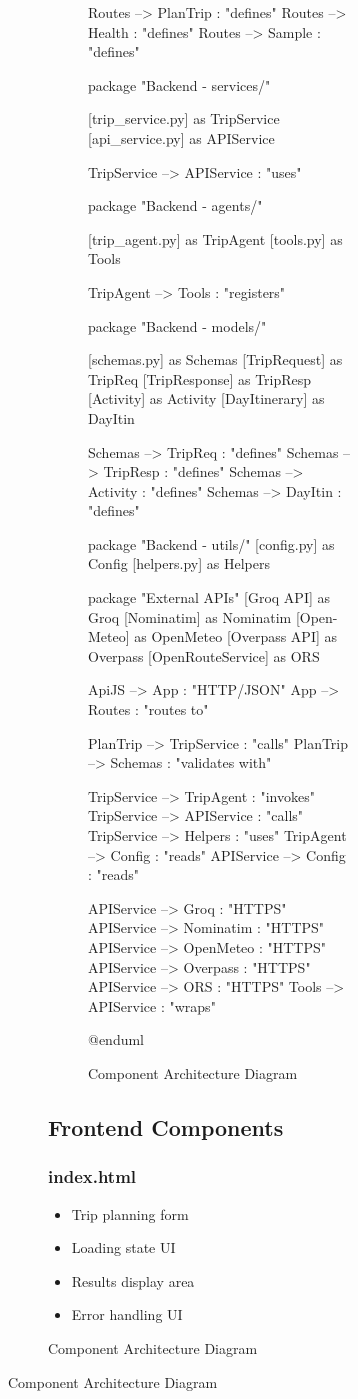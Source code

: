 \documentclass[12pt,a4paper]{report}
\begin{document}
\begin{figure}[H]
\begin{plantuml}
\begin{figure}[H]
\begin{plantuml}
{\begin{landscape}
\begin{figure}[H]
\begin{plantuml}
{    Routes --> PlanTrip : "defines"
    Routes --> Health : "defines"
    Routes --> Sample : "defines"
}

package "Backend - services/" {
    [trip_service.py] as TripService
    [api_service.py] as APIService
    
    TripService --> APIService : "uses"
}

package "Backend - agents/" {
    [trip_agent.py] as TripAgent
    [tools.py] as Tools
    
    TripAgent --> Tools : "registers"
}

package "Backend - models/" {
    [schemas.py] as Schemas
    [TripRequest] as TripReq
    [TripResponse] as TripResp
    [Activity] as Activity
    [DayItinerary] as DayItin
    
    Schemas --> TripReq : "defines"
    Schemas --> TripResp : "defines"
    Schemas --> Activity : "defines"
    Schemas --> DayItin : "defines"
}

package "Backend - utils/" {
    [config.py] as Config
    [helpers.py] as Helpers
}

package "External APIs" {
    [Groq API] as Groq
    [Nominatim] as Nominatim
    [Open-Meteo] as OpenMeteo
    [Overpass API] as Overpass
    [OpenRouteService] as ORS
}

ApiJS --> App : "HTTP/JSON"
App --> Routes : "routes to"

PlanTrip --> TripService : "calls"
PlanTrip --> Schemas : "validates with"

TripService --> TripAgent : "invokes"
TripService --> APIService : "calls"
TripService --> Helpers : "uses"
TripAgent --> Config : "reads"
APIService --> Config : "reads"

APIService --> Groq : "HTTPS"
APIService --> Nominatim : "HTTPS"
APIService --> OpenMeteo : "HTTPS"
APIService --> Overpass : "HTTPS"
APIService --> ORS : "HTTPS"
Tools --> APIService : "wraps"

@enduml
    \end{plantuml}
    \caption{Component Architecture Diagram}
    \label{fig:component-arch}
\end{figure}
\end{landscape}
\clearpage
}

\subsection{Frontend Components}

\subsubsection{index.html}
\begin{itemize}
    \item Trip planning form
    \item Loading state UI
    \item Results display area
    \item Error handling UI
\end{itemize}


\end{plantuml}
\end{figure}
\end{plantuml}
\end{figure}
\end{document}
